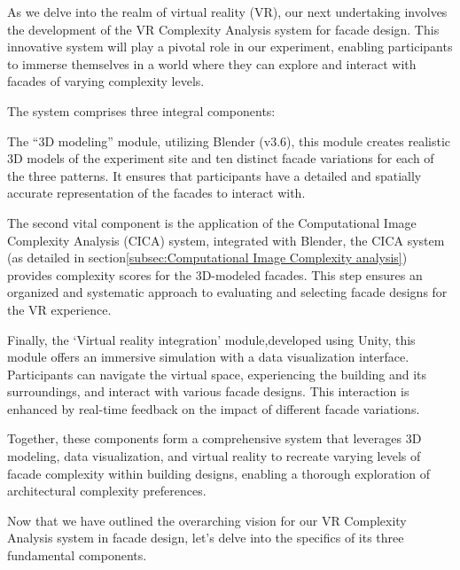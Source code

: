 As we delve into the realm of virtual reality (VR), our next undertaking involves the development of the VR Complexity Analysis system for facade design.
This innovative system will play a pivotal role in our experiment, enabling participants to immerse themselves in a world where they can explore and interact with facades of varying complexity levels.

The system comprises three integral components:

The ``3D modeling'' module, utilizing Blender (v3.6), this module creates realistic 3D models of the experiment site and ten distinct facade variations for each of the three patterns.
It ensures that participants have a detailed and spatially accurate representation of the facades to interact with.

The second vital component is the application of the Computational Image Complexity Analysis (CICA) system, integrated with Blender, the CICA system (as detailed in section\ref{subsec:Computational Image Complexity analysis}) provides complexity scores for the 3D-modeled facades.
This step ensures an organized and systematic approach to evaluating and selecting facade designs for the VR experience.

Finally, the `Virtual reality integration' module,developed using Unity, this module offers an immersive simulation with a data visualization interface.
Participants can navigate the virtual space, experiencing the building and its surroundings, and interact with various facade designs.
This interaction is enhanced by real-time feedback on the impact of different facade variations.

Together, these components form a comprehensive system that leverages 3D modeling, data visualization, and virtual reality to recreate varying levels of facade complexity within building designs, enabling a thorough exploration of architectural complexity preferences.

Now that we have outlined the overarching vision for our VR Complexity Analysis system in facade design, let's delve into the specifics of its three fundamental components.


